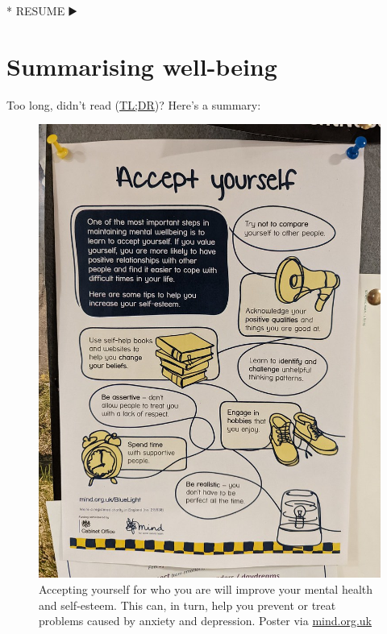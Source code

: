 \documentclass[
]{book}
\newenvironment{Shaded}{\begin{snugshade}}{\end{snugshade}}
\newcommand{\NormalTok}[1]{#1}
\newcommand{\SpecialStringTok}[1]{\textcolor[rgb]{0.31,0.60,0.02}{#1}}
\begin{document}
\begin{Shaded}
\begin{Highlighting}[]
\SpecialStringTok{* }\NormalTok{RESUME ▶️}
\end{Highlighting}
\end{Shaded}

\hypertarget{tldr3}{%
\section{Summarising well-being}\label{tldr3}}

Too long, didn't read (\href{https://en.wiktionary.org/wiki/too_long;_didn\%27t_read}{TL;DR})? Here's a summary:

\begin{figure}
\includegraphics[width=1\linewidth]{images/accept-yourself} \caption{Accepting yourself for who you are will improve your mental health and self-esteem. This can, in turn, help you prevent or treat problems caused by anxiety and depression. Poster via \href{https://www.mind.org.uk/}{mind.org.uk}}\label{fig:mindyourhealth-fig}
\end{figure}
\end{document}
